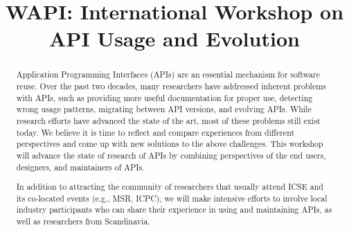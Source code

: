 \documentclass[10pt, conference]{IEEEtran}
\newcommand{\shortname}{WAPI}
\begin{document}
\title{\shortname{}: International Workshop on API Usage and Evolution}


\newcommand\tud[0]{\textsuperscript{\normalfont \textdagger}}
\newcommand\iowa[0]{\textsuperscript{\normalfont \textparagraph}}
\newcommand\utd[0]{\textsuperscript{\normalfont \ddag}}
\newcommand\lanu[0]{\textsuperscript{\normalfont \textsection}}
\newcommand\ualberta[0]{\textsuperscript{\normalfont \textasteriskcentered}}

\author{
}


\maketitle


\begin{abstract}
Application Programming Interfaces (APIs) are an essential mechanism for software reuse. Over the past two decades, many researchers have addressed inherent problems with APIs, such as providing more useful documentation for proper use, detecting wrong usage patterns, migrating between API versions, and evolving APIs. While research efforts have advanced the state of the art, most of these problems still exist today. We believe it is time to reflect and compare experiences from different perspectives and come up with new solutions to the above challenges. This workshop will advance the state of research of APIs by combining perspectives of the end users, designers, and maintainers of APIs.

In addition to attracting the community of researchers that usually attend ICSE and its co-located events (e.g., MSR, ICPC), we will make intensive efforts to involve local industry participants who can share their experience in using and maintaining APIs, as well as researchers from Scandinavia.
\end{abstract}
\end{document}
